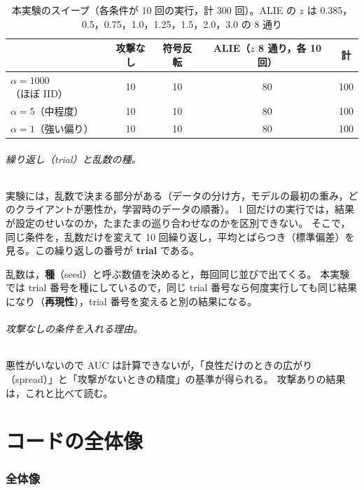 \documentclass[a4j, dvipdfmx]{jsarticle}  %
\begin{document}
\begin{table}[H]
\centering
\caption{本実験のスイープ（各条件が 10 回の実行，計 300 回）。ALIE の $z$ は 0.385，0.5，0.75，1.0，1.25，1.5，2.0，3.0 の 8 通り}
\begin{tabular}{@{}lcccc@{}}
\toprule
 & 攻撃なし & 符号反転 & ALIE（$z$ 8 通り，各 10 回） & 計 \\
\midrule
$\alpha = 1000$（ほぼ IID） & 10 & 10 & 80 & 100 \\
$\alpha = 5$（中程度） & 10 & 10 & 80 & 100 \\
$\alpha = 1$（強い偏り） & 10 & 10 & 80 & 100 \\
\bottomrule
\end{tabular}
\end{table}

\paragraph{繰り返し（trial）と乱数の種。}
実験には，乱数で決まる部分がある（データの分け方，モデルの最初の重み，どのクライアントが悪性か，学習時のデータの順番）。
1 回だけの実行では，結果が設定のせいなのか，たまたまの巡り合わせなのかを区別できない。
そこで，同じ条件を，乱数だけを変えて 10 回繰り返し，平均とばらつき（標準偏差）を見る。この繰り返しの番号が \textbf{trial} である。

乱数は，\textbf{種}（seed）と呼ぶ数値を決めると，毎回同じ並びで出てくる。
本実験では trial 番号を種にしているので，同じ trial 番号なら何度実行しても同じ結果になり（\textbf{再現性}），trial 番号を変えると別の結果になる。

\paragraph{攻撃なしの条件を入れる理由。}
悪性がいないので AUC は計算できないが，「良性だけのときの広がり（spread）」と「攻撃がないときの精度」の基準が得られる。
攻撃ありの結果は，これと比べて読む。

\part{コードの全体像}
\label{part:code}

\section{全体像}
\label{sec:overview}
\end{document}
